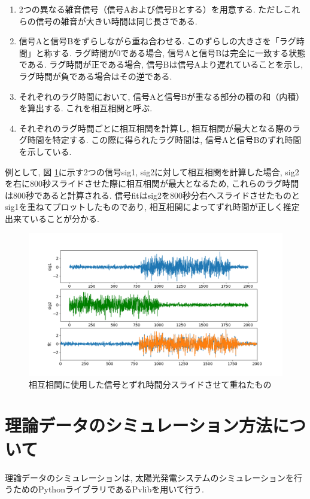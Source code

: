 \documentclass[a4j,12pt,]{jarticle}
\begin{document}
\begin{enumerate}
  \item 2つの異なる雑音信号（信号Aおよび信号Bとする）を用意する. ただしこれらの信号の雑音が大きい時間は同じ長さである.
  \item 信号Aと信号Bをずらしながら重ね合わせる. このずらしの大きさを「ラグ時間」と称する. ラグ時間が0である場合, 信号Aと信号Bは完全に一致する状態である. ラグ時間が正である場合, 信号Bは信号Aより遅れていることを示し, ラグ時間が負である場合はその逆である.
  \item それぞれのラグ時間において, 信号Aと信号Bが重なる部分の積の和（内積）を算出する. これを相互相関と呼ぶ.
  \item それぞれのラグ時間ごとに相互相関を計算し, 相互相関が最大となる際のラグ時間を特定する. この際に得られたラグ時間は, 信号Aと信号Bのずれ時間を示している.
\end{enumerate}

例として, 図 \ref{p1}に示す2つの信号sig1, sig2に対して相互相関を計算した場合, sig2を右に800秒スライドさせた際に相互相関が最大となるため, これらのラグ時間は800秒であると計算される. 信号fitはsig2を800秒分右へスライドさせたものとsig1を重ねてプロットしたものであり, 相互相関によってずれ時間が正しく推定出来ていることが分かる.

\begin{figure}[H]
  \begin{center}
    \includegraphics[width=160mm]{corr_sample.png}
    \caption{相互相関に使用した信号とずれ時間分スライドさせて重ねたもの}
    \label{p1}
  \end{center}
\end{figure}

\section{理論データのシミュレーション方法について}
理論データのシミュレーションは, 太陽光発電システムのシミュレーションを行うためのPythonライブラリであるPvlibを用いて行う\cite{2}.
\end{document}
